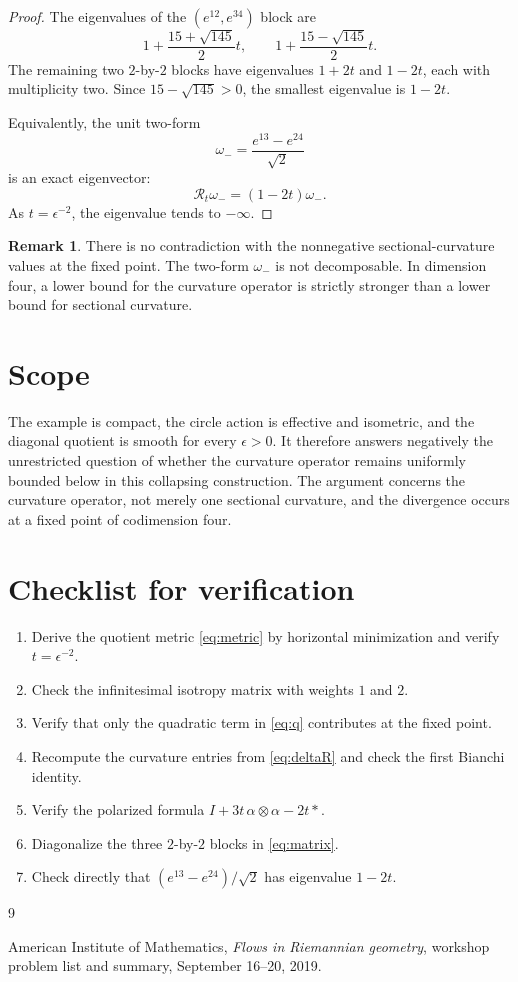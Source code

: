 \documentclass[10pt,reqno]{amsart}
\theoremstyle{definition}
\newtheorem{remark}[theorem]{Remark}
\begin{document}
\begin{proof}
The eigenvalues of the \((e^{12},e^{34})\) block are
\[
 1+\frac{15+\sqrt{145}}2t,\qquad
 1+\frac{15-\sqrt{145}}2t.
\]
The remaining two \(2\)-by-\(2\) blocks have eigenvalues \(1+2t\) and
\(1-2t\), each with multiplicity two.  Since
\(15-\sqrt{145}>0\), the smallest eigenvalue is \(1-2t\).

Equivalently, the unit two-form
\[
 \omega_-=\frac{e^{13}-e^{24}}{\sqrt2}
\]
is an exact eigenvector:
\[
 \mathcal R_t\omega_-=(1-2t)\omega_-.
\]
As \(t=\epsilon^{-2}\), the eigenvalue tends to \(-\infty\).
\end{proof}

\begin{remark}\label{rem:sectional}
There is no contradiction with the nonnegative sectional-curvature values
at the fixed point.  The two-form \(\omega_-\) is not decomposable.  In
dimension four, a lower bound for the curvature operator is strictly stronger
than a lower bound for sectional curvature.
\end{remark}

\section{Scope}

The example is compact, the circle action is effective and isometric, and
the diagonal quotient is smooth for every \(\epsilon>0\).  It therefore
answers negatively the unrestricted question of whether the curvature
operator remains uniformly bounded below in this collapsing construction.
The argument concerns the curvature operator, not merely one sectional
curvature, and the divergence occurs at a fixed point of codimension four.

\appendix

\section{Checklist for verification}

\begin{enumerate}
  \item Derive the quotient metric \eqref{eq:metric} by horizontal
  minimization and verify \(t=\epsilon^{-2}\).
  \item Check the infinitesimal isotropy matrix with weights \(1\) and \(2\).
  \item Verify that only the quadratic term in \eqref{eq:q} contributes at the
  fixed point.
  \item Recompute the curvature entries from \eqref{eq:deltaR} and check the
  first Bianchi identity.
  \item Verify the polarized formula
  \(I+3t\,\alpha\otimes\alpha-2t*\).
  \item Diagonalize the three \(2\)-by-\(2\) blocks in
  \eqref{eq:matrix}.
  \item Check directly that
  \((e^{13}-e^{24})/\sqrt2\) has eigenvalue \(1-2t\).
\end{enumerate}

\begin{thebibliography}{9}

American Institute of Mathematics,
\emph{Flows in Riemannian geometry},
workshop problem list and summary, September 16--20, 2019.

\end{thebibliography}
\end{document}
